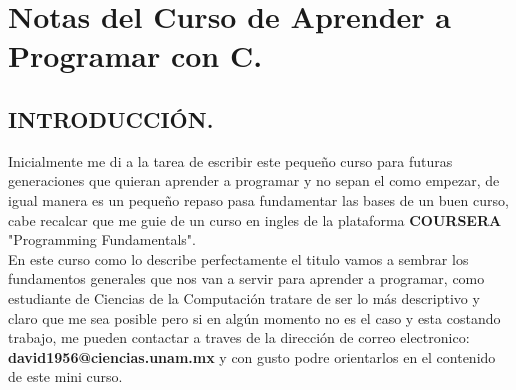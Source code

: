 \documentclass[12pt]{article}
\begin{document}

{\color{blue} \section*{\textbf{Notas del Curso de Aprender a Programar con C.}}}
\vspace{1em}

{\color{red} \subsection*{\textbf{INTRODUCCIÓN.}}}

Inicialmente me di a la tarea de escribir este pequeño curso para futuras generaciones que  quieran aprender a programar y no sepan el como empezar, de igual 
manera es un pequeño repaso pasa fundamentar las bases de un buen curso, cabe recalcar que me guie de un curso en ingles de la plataforma \textbf{COURSERA} "Programming Fundamentals".\\

En este curso como lo describe perfectamente el titulo vamos a sembrar los fundamentos generales que nos van a servir para aprender a programar, como estudiante de Ciencias de la Computación tratare de ser lo más descriptivo y claro que me sea 
posible pero si en algún momento no es el caso y esta costando trabajo, me pueden contactar a traves de la dirección de correo electronico: \textbf{david1956@ciencias.unam.mx} y con gusto podre orientarlos en el contenido de este mini curso.\\
\end{document}

